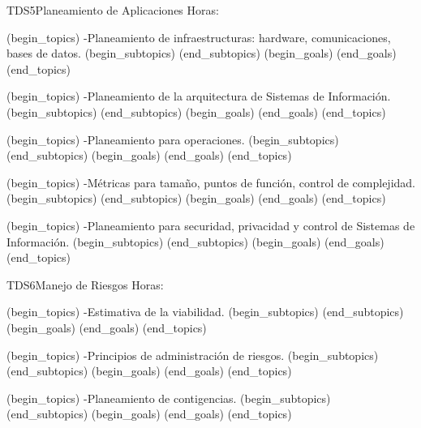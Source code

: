 \begin{BKL2}{TDS5}{Planeamiento de Aplicaciones}
Horas:
 
(begin_topics)
-Planeamiento de infraestructuras: hardware, comunicaciones, bases de datos.
(begin_subtopics)
(end_subtopics)
(begin_goals)
(end_goals)
(end_topics)

 
(begin_topics)
-Planeamiento de la arquitectura de Sistemas de Información.
(begin_subtopics)
(end_subtopics)
(begin_goals)
(end_goals)
(end_topics)

 
(begin_topics)
-Planeamiento para operaciones.
(begin_subtopics)
(end_subtopics)
(begin_goals)
(end_goals)
(end_topics)

 
(begin_topics)
-Métricas para tamaño, puntos de función, control de complejidad.
(begin_subtopics)
(end_subtopics)
(begin_goals)
(end_goals)
(end_topics)

 
(begin_topics)
-Planeamiento para securidad, privacidad y control de Sistemas de Información.
(begin_subtopics)
(end_subtopics)
(begin_goals)
(end_goals)
(end_topics)

\end{BKL2}



\begin{BKL2}{TDS6}{Manejo de Riesgos}
Horas:
 
(begin_topics)
-Estimativa de la viabilidad.
(begin_subtopics)
(end_subtopics)
(begin_goals)
(end_goals)
(end_topics)

 
(begin_topics)
-Principios de administración de riesgos.
(begin_subtopics)
(end_subtopics)
(begin_goals)
(end_goals)
(end_topics)

 
(begin_topics)
-Planeamiento de contigencias.
(begin_subtopics)
(end_subtopics)
(begin_goals)
(end_goals)
(end_topics)

\end{BKL2}



